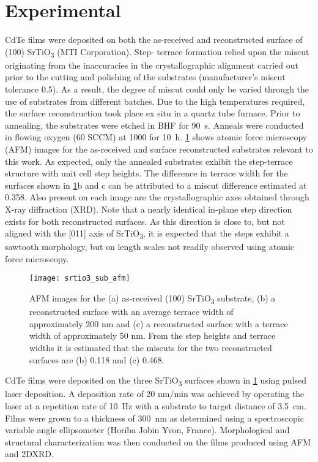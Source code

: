 \section{Experimental}
CdTe films were deposited on both the as-received and
reconstructed surface of (100) SrTiO\textsubscript{3} (MTI Corporation). Step-
terrace formation relied upon the miscut originating from the
inaccuracies in the crystallographic alignment carried out prior to
the cutting and polishing of the substrates (manufacturer’s miscut
tolerance 0.5\degree). As a result, the degree of miscut could only be
varied through the use of substrates from different batches. Due to
the high temperatures required, the surface reconstruction took
place ex situ in a quartz tube furnace. Prior to annealing, the
substrates were etched in BHF for 90~s. Anneals were conducted in
flowing oxygen (60 SCCM) at 1000\celsius{} for 10~h. \cref{fig:srtio3_sub_afm} shows
atomic force microscopy (AFM) images for the as-received and
surface reconstructed substrates relevant to this work. As
expected, only the annealed substrates exhibit the step-terrace
structure with unit cell step heights. The difference in terrace
width for the surfaces shown in \cref{fig:srtio3_sub_afm}b and c can be attributed to a
miscut difference estimated at 0.358\degree. Also present on each image
are the crystallographic axes obtained through X-ray diffraction
(XRD). Note that a nearly identical in-plane step direction exists for
both reconstructed surfaces. As this direction is close to, but not
aligned with the [011] axis of SrTiO\textsubscript{3}, it is expected that the steps
exhibit a sawtooth morphology, but on length scales not readily
observed using atomic force microscopy.
\begin{figure}
    \centering
    \texttt{[image: srtio3\_sub\_afm]}
    \caption[AFM of SrTiO\textsubscript{3} surfaces]{\label{fig:srtio3_sub_afm}AFM images for the (a) as-received (100) SrTiO\textsubscript{3} substrate, (b) a reconstructed surface with an average terrace width of approximately 200 nm and (c) a reconstructed surface with a terrace width of approximately 50 nm. From the step heights and terrace widths it is estimated that the miscuts for the two reconstructed surfaces are (b) 0.118\degree{}
        and (c) 0.468\degree{}.}
\end{figure}

CdTe films were deposited on the three SrTiO\textsubscript{3} surfaces shown
in \cref{fig:srtio3_sub_afm} using pulsed laser deposition. A deposition rate of 20 nm/min was achieved by
operating the laser at a repetition rate of 10~Hz with a substrate to
target distance of 3.5~cm. Films were grown to
a thickness of 300~nm as determined using a spectroscopic variable
angle ellipsometer (Horiba Jobin Yvon, France). Morphological and
structural characterization was then conducted on the films
produced using AFM and 2DXRD.
